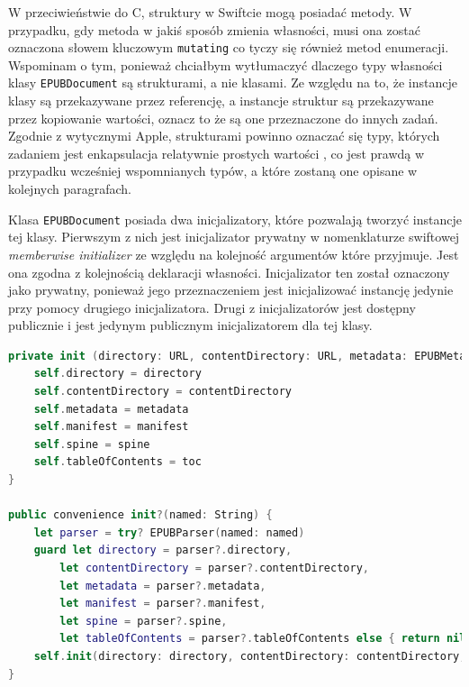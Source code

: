 W przeciwieństwie do C, struktury w Swiftcie mogą posiadać metody. W przypadku, gdy metoda w jakiś sposób zmienia własności, musi ona zostać oznaczona słowem kluczowym \texttt{mutating} co tyczy się również metod enumeracji. Wspominam o tym, ponieważ chciałbym wytłumaczyć dlaczego typy własności klasy \texttt{EPUBDocument} są strukturami, a nie klasami. Ze względu na to, że instancje klasy są przekazywane przez referencję, a instancje struktur są przekazywane przez kopiowanie wartości, oznacz to że są one przeznaczone do innych zadań. Zgodnie z wytycznymi Apple, strukturami powinno oznaczać się typy, których zadaniem jest enkapsulacja relatywnie prostych wartości \cite{theSwiftProgrammingLanguageStructsPurpose}, co jest prawdą w przypadku wcześniej wspomnianych typów, a które zostaną one opisane w kolejnych paragrafach.

Klasa \texttt{EPUBDocument} posiada dwa inicjalizatory, które pozwalają tworzyć instancje tej klasy. Pierwszym z nich jest inicjalizator prywatny w nomenklaturze swiftowej \textit{memberwise initializer} ze względu na kolejność argumentów które przyjmuje. Jest ona zgodna  z kolejnością deklaracji własności. Inicjalizator ten został oznaczony jako prywatny, ponieważ jego przeznaczeniem jest inicjalizować instancję jedynie przy pomocy drugiego inicjalizatora. Drugi z inicjalizatorów jest dostępny publicznie i jest jedynym publicznym inicjalizatorem dla tej klasy.

\begin{lstlisting}[caption={Inicjalizatory klasy EPUBDocument}, language=swift,label=gysdffregr]
private init (directory: URL, contentDirectory: URL, metadata: EPUBMetadata, manifest: EPUBManifest, spine: EPUBSpine, toc: EPUBTableOfContents) {
    self.directory = directory
    self.contentDirectory = contentDirectory
    self.metadata = metadata
    self.manifest = manifest
    self.spine = spine
    self.tableOfContents = toc
}

public convenience init?(named: String) {
    let parser = try? EPUBParser(named: named)
    guard let directory = parser?.directory,
        let contentDirectory = parser?.contentDirectory,
        let metadata = parser?.metadata,
        let manifest = parser?.manifest,
        let spine = parser?.spine,
        let tableOfContents = parser?.tableOfContents else { return nil }
    self.init(directory: directory, contentDirectory: contentDirectory, metadata: metadata, manifest: manifest, spine: spine, toc: tableOfContents)
}
\end{lstlisting}

